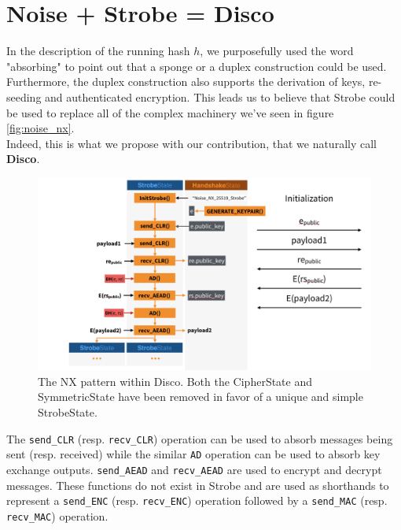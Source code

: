 \documentclass{article}
\begin{document}
\section{Noise + Strobe = Disco}

In the description of the running hash $h$, we purposefully used the word "absorbing" to point out that a sponge or a duplex construction could be used. Furthermore, the duplex construction also supports the derivation of keys, re-seeding and authenticated encryption. This leads us to believe that Strobe could be used to replace all of the complex machinery we've seen in figure \ref{fig:noise_nx}.\\

Indeed, this is what we propose with our contribution, that we naturally call \textbf{Disco}.

\begin{figure}[H]
\centering
\includegraphics[width=\textwidth]{rwcimg/disco_NX.png}
\caption{The NX pattern within Disco. Both the CipherState and SymmetricState have been removed in favor of a unique and simple StrobeState.}
\end{figure}

The \texttt{send_CLR} (resp. \texttt{recv_CLR}) operation can be used to absorb messages being sent (resp. received) while the similar \texttt{AD} operation can be used to absorb key exchange outputs. \texttt{send_AEAD} and \texttt{recv_AEAD} are used to encrypt and decrypt messages. These functions do not exist in Strobe and are used as shorthands to represent a \texttt{send_ENC} (resp. \texttt{recv_ENC}) operation followed by a \texttt{send_MAC} (resp. \texttt{recv_MAC}) operation.\\
\end{document}
